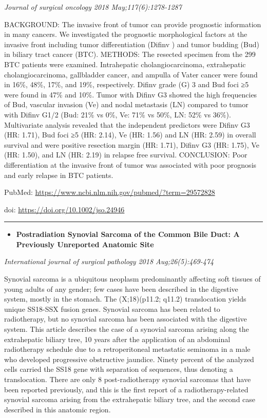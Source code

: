 \documentclass[]{article}
\providecommand{\tightlist}{%
  \setlength{\itemsep}{0pt}\setlength{\parskip}{0pt}}
\begin{document}
\emph{Journal of surgical oncology 2018 May;117(6):1278-1287}

BACKGROUND: The invasive front of tumor can provide prognostic
information in many cancers. We investigated the prognostic
morphological factors at the invasive front including tumor
differentiation (Difinv ) and tumor budding (Bud) in biliary tract
cancer (BTC). METHODS: The resected specimen from the 299 BTC patients
were examined. Intrahepatic cholangiocarcinoma, extrahepatic
cholangiocarcinoma, gallbladder cancer, and ampulla of Vater cancer were
found in 16\%, 48\%, 17\%, and 19\%, respectively. Difinv grade (G) 3
and Bud foci ≥5 were found in 47\% and 10\%. Tumor with Difinv G3 showed
the high frequencies of Bud, vascular invasion (Ve) and nodal metastasis
(LN) compared to tumor with Difinv G1/2 (Bud: 21\% vs 0\%, Ve: 71\% vs
50\%, LN: 52\% vs 36\%). Multivariate analysis revealed that the
independent predictors were Difinv G3 (HR: 1.71), Bud foci ≥5 (HR:
2.14), Ve (HR: 1.56) and LN (HR: 2.59) in overall survival and were
positive resection margin (HR: 1.71), Difinv G3 (HR: 1.75), Ve (HR:
1.50), and LN (HR: 2.19) in relapse free survival. CONCLUSION: Poor
differentiation at the invasive front of tumor was associated with poor
prognosis and early relapse in BTC patients.

PubMed: \url{https://www.ncbi.nlm.nih.gov/pubmed/?term=29572828}

doi: \url{https://doi.org/10.1002/jso.24946}

{}

{}

\begin{center}\rule{0.5\linewidth}{\linethickness}\end{center}

\begin{itemize}
\tightlist
\item
  \textbf{Postradiation Synovial Sarcoma of the Common Bile Duct: A
  Previously Unreported Anatomic Site}
\end{itemize}

\emph{International journal of surgical pathology 2018
Aug;26(5):469-474}

Synovial sarcoma is a ubiquitous neoplasm predominantly affecting soft
tissues of young adults of any gender; few cases have been described in
the digestive system, mostly in the stomach. The (X;18)(p11.2; q11.2)
translocation yields unique SS18-SSX fusion genes. Synovial sarcoma has
been related to radiotherapy, but no synovial sarcoma has been
associated with the digestive system. This article describes the case of
a synovial sarcoma arising along the extrahepatic biliary tree, 10 years
after the application of an abdominal radiotherapy schedule due to a
retroperitoneal metastatic seminoma in a male who developed progressive
obstructive jaundice. Ninety percent of the analyzed cells carried the
SS18 gene with separation of sequences, thus denoting a translocation.
There are only 8 post-radiotherapy synovial sarcomas that have been
reported previously, and this is the first report of a
radiotherapy-related synovial sarcoma arising from the extrahepatic
biliary tree, and the second case described in this anatomic region.
\end{document}
